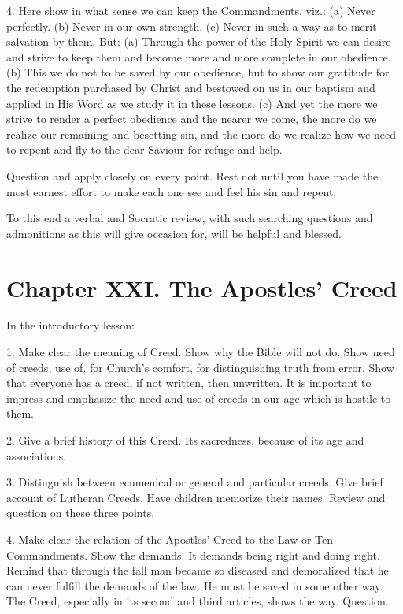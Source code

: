  4. Here show in what sense we can keep the Commandments, viz.: (a) Never perfectly. (b) Never in our own strength. (c) Never in such a way as to merit salvation by them. But: (a) Through the power of the Holy Spirit we can desire and strive to keep them and become more and more complete in our obedience. (b) This we do not to be saved by our obedience, but to show our gratitude for the redemption purchased by Christ
and bestowed on us in our baptism and applied in His Word as we study it in these lessons. (c) And yet the more we strive to render a perfect obedience and the nearer we come, the more do we realize our remaining and besetting sin, and the more do we realize how we need to repent and fly to the dear Saviour for refuge and help.

Question and apply closely on every point. Rest not until you have made the most earnest effort to make each one see and feel his sin and repent.

To this end a verbal and Socratic review, with such searching questions and admonitions as this will give occasion for, will be helpful and blessed.

\chapter{Chapter XXI. The Apostles’ Creed}

In the introductory lesson:

 1. Make clear the meaning of Creed. Show why the Bible will not do. Show need of creeds, use of, for Church’s comfort, for distinguishing truth from error. Show that everyone has a creed, if not written, then unwritten. It is important to impress and emphasize the need and use of creeds in our age which is hostile to them.

2. Give a brief history of this Creed. Its sacredness, because of its age and associations.

3. Distinguish between ecumenical or general and particular creeds. Give brief account of Lutheran Creeds. Have children memorize their names. Review and question on these three points.

 4. Make clear the relation of the Apostles’ Creed to the Law or Ten Commandments. Show the demands. It demands being right and doing right. Remind that through the fall man became so diseased and demoralized that he can never fulfill the demands of the law. He must be saved in some other way. The Creed, especially in its second and third articles, shows the way. Question.


